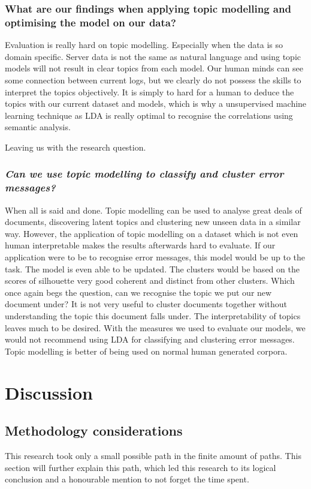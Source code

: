 \subsubsection{What are our findings when applying topic modelling and optimising the model on our data?}
Evaluation is really hard on topic modelling. Especially when the data is so domain specific. Server data is not the same as natural language and using topic models will not result in clear topics from each model. Our human minds can see some connection between current logs, but we clearly do not possess the skills to interpret the topics objectively. It is simply to hard for a human to deduce the topics with our current dataset and models, which is why a unsupervised machine learning technique as LDA is really optimal to recognise the correlations using semantic analysis.

\noindent Leaving us with the research question.

\subsubsection{\textbf{\textit{Can we use topic modelling to classify and cluster error messages?}}}

When all is said and done. Topic modelling can be used to analyse great deals of documents, discovering latent topics and clustering new unseen data in a similar way. However, the application of topic modelling on a dataset which is not even human interpretable makes the results afterwards hard to evaluate. If our application were to be to recognise error messages, this model would be up to the task. The model is even able to be updated. The clusters would be based on the scores of silhouette very good coherent and distinct from other clusters. Which once again begs the question, can we recognise the topic we put our new document under? It is not very useful to cluster documents together without understanding the topic this document falls under. The interpretability of topics leaves much to be desired. With the measures we used to evaluate our models, we would not recommend using LDA for classifying and clustering error messages. Topic modelling is better of being used on normal human generated corpora.

\section{Discussion}

\subsection {Methodology considerations}
This research took only a small possible path in the finite amount of paths. This section will further explain this path, which led this research to its logical conclusion and a honourable mention to not forget the time spent.

